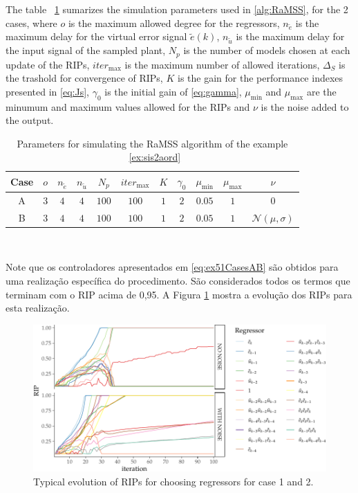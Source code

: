 \begin{exmp}
The table ~\ref{tab:exp51_param} sumarizes the simulation parameters used in \ref{alg:RaMSS}, for the 2 cases,
where $o$ is the maximum allowed degree for the regressors, $n_{\tilde{e}}$ is the maximum delay for the virtual error signal $\tilde{e}(k)$, $n_{\tilde{u}}$ is the maximum delay for the input signal of the sampled plant, $ N_p$ is the number of models chosen at each update of the RIPs, $ iter_{\max} $ is the maximum number of allowed iterations, $\Delta_S$ is the trashold for convergence of RIPs, $K$ is the gain for the performance indexes presented in \ref{eq:Js}, $\gamma_0$ is the initial gain of \ref{eq:gamma}, $\mu_{\min}$ and $\mu_{\max}$ are the minumum and maximum values allowed for the RIPs and $\nu$ is the noise added to the output.
\begin{table}[htpb]
  \centering
  \caption{Parameters for simulating the RaMSS algorithm of the example ~\ref{ex:sis2aord}}\label{tab:exp51_param}
  \begin{tabular}{c|c|c|c|c|c|c|c|c|c|c}
    Case & $o$ & $n_{\tilde{e}}$ & $n_{\tilde{u}}$ & $ N_p$ & $ iter_{\max} $ & $K$ & $\gamma_0$ &  $\mu_{\min}$ & $\mu_{\max}$ & $\nu$\\
    \hline
    A & $ 3 $ & $4$ & $4$ & $100$ & $100$ & $1$ & $2$ & $0.05$ & $1$ & $0$ \\
    B & $ 3 $ & $4$ & $4$ & $100$ & $100$ & $1$ & $2$ & $0.05$ & $1$ & $\mathcal{N}(\mu,\sigma)$
  \end{tabular}
\end{table}\\

Note que os controladores apresentados em \eqref{eq:ex51CasesAB} são obtidos para uma realização específica do procedimento. São considerados todos os termos que terminam com o RIP acima de 0,95. 
A Figura \ref{fig:ex51_RIPevol_2cases} mostra a evolução dos RIPs para esta realização. 

\begin{figure}[H]
  \centering
  \includegraphics[width=\textwidth]{Figs/Cap5/ex51_rips_evol_2cases.tex.pdf}
  \caption{Typical evolution of RIPs for choosing regressors for case 1 and 2.}
  \label{fig:ex51_RIPevol_2cases}
\end{figure}


\end{exmp}
